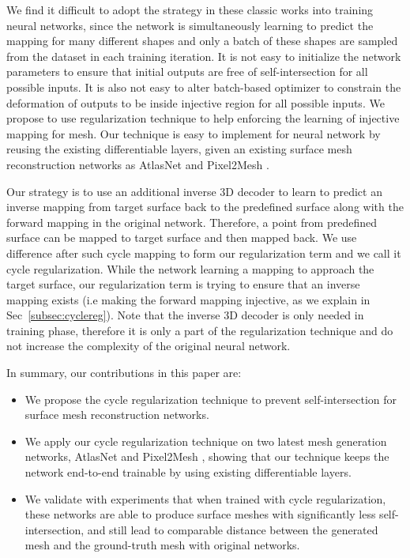 We find it difficult to adopt the strategy in these classic works into training neural networks, since the network is simultaneously learning to predict the mapping for many different shapes and only a batch of these shapes are sampled from the dataset in each training iteration. It is not easy to initialize the network parameters to ensure that initial outputs are free of self-intersection for all possible inputs. It is also not easy to alter batch-based optimizer to constrain the deformation of outputs to be inside injective region for all possible inputs. We propose to use regularization technique to help enforcing the learning of injective mapping for mesh. Our technique is easy to implement for neural network by reusing the existing differentiable layers, given an existing surface mesh reconstruction networks as AtlasNet \cite{atlasnet} and Pixel2Mesh \cite{pixel2mesh}.

 Our strategy is to use an additional inverse 3D decoder to learn to predict an inverse mapping from target surface back to the predefined surface along with the forward mapping in the original network. Therefore, a point from predefined surface can be mapped to target surface and then mapped back. We use difference after such cycle mapping to form our regularization term and we call it cycle regularization. While the network learning a mapping to approach the target surface, our regularization term is trying to ensure that an inverse mapping exists (i.e making the forward mapping injective, as we explain in Sec~\ref{subsec:cyclereg}).
Note that the inverse 3D decoder is only needed in training phase, therefore it is only a part of the regularization technique and do not increase the complexity of the original neural network.

In summary, our contributions in this paper are:
\begin{itemize}
	\item We propose the cycle regularization technique to prevent self-intersection for surface mesh reconstruction networks. 
	\item We apply our cycle regularization technique on two latest mesh generation networks, AtlasNet \cite{atlasnet} and Pixel2Mesh \cite{pixel2mesh}, showing that our technique keeps the network end-to-end trainable by using existing differentiable layers.
	\item We validate with experiments that when trained with cycle regularization, these networks are able to produce surface meshes with significantly less self-intersection, and still lead to comparable distance between the generated mesh and the ground-truth mesh with original networks. 
\end{itemize}

 